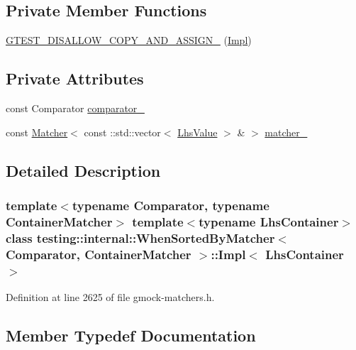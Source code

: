 \subsection*{Private Member Functions}
\begin{DoxyCompactItemize}
\item 
\hyperlink{classtesting_1_1internal_1_1WhenSortedByMatcher_1_1Impl_af5327d86f58f006cba4e49eb26c69d79}{G\+T\+E\+S\+T\+\_\+\+D\+I\+S\+A\+L\+L\+O\+W\+\_\+\+C\+O\+P\+Y\+\_\+\+A\+N\+D\+\_\+\+A\+S\+S\+I\+G\+N\+\_\+} (\hyperlink{classtesting_1_1internal_1_1WhenSortedByMatcher_1_1Impl}{Impl})
\end{DoxyCompactItemize}
\subsection*{Private Attributes}
\begin{DoxyCompactItemize}
\item 
const Comparator \hyperlink{classtesting_1_1internal_1_1WhenSortedByMatcher_1_1Impl_a951b20230b095e7777c23cba8f143f32}{comparator\+\_\+}
\item 
const \hyperlink{classtesting_1_1Matcher}{Matcher}$<$ const \+::std\+::vector$<$ \hyperlink{classtesting_1_1internal_1_1WhenSortedByMatcher_1_1Impl_a93044f4ba53373fcfc424132b5e6c462}{Lhs\+Value} $>$ \& $>$ \hyperlink{classtesting_1_1internal_1_1WhenSortedByMatcher_1_1Impl_a4675b8bb38c5996ad8e570eafe4f72ea}{matcher\+\_\+}
\end{DoxyCompactItemize}


\subsection{Detailed Description}
\subsubsection*{template$<$typename Comparator, typename Container\+Matcher$>$\newline
template$<$typename Lhs\+Container$>$\newline
class testing\+::internal\+::\+When\+Sorted\+By\+Matcher$<$ Comparator, Container\+Matcher $>$\+::\+Impl$<$ Lhs\+Container $>$}



Definition at line 2625 of file gmock-\/matchers.\+h.



\subsection{Member Typedef Documentation}
\mbox{\label{classtesting_1_1internal_1_1WhenSortedByMatcher_1_1Impl_a2cb1a8d85ca2c376b6abdbcb00d84759}} 
